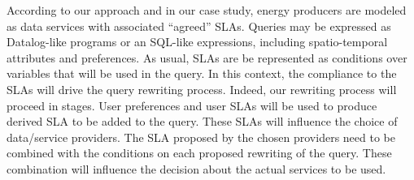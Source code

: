 According to our approach and in our case study, energy producers are modeled as data services with associated ``agreed'' SLAs.
%
Queries may be expressed as Datalog-like programs or an SQL-like expressions, including spatio-temporal attributes and preferences.
%
%
%
As usual, SLAs are be represented as conditions over variables that will be used in the query.
In this context, the compliance to the SLAs will drive the query rewriting process.
Indeed, our rewriting process will proceed in stages.
User preferences and user SLAs will be used to produce derived SLA to be added to the query. 
These SLAs will influence the choice of data/service providers.
The SLA proposed by the chosen providers need to be combined with the conditions on each proposed rewriting of the query.
These combination will influence the decision about the actual services to be used.

